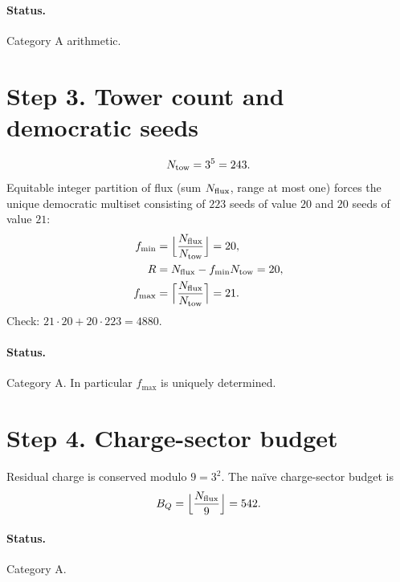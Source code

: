 \paragraph{Status.} Category A arithmetic.

\section{Step 3. Tower count and democratic seeds}

\begin{equation}
N_{\mathrm{tow}}
=
3^{5}
=
243.
\end{equation}
Equitable integer partition of flux (sum \(N_{\mathrm{flux}}\), range at most one) forces the unique democratic multiset consisting of \(223\) seeds of value \(20\) and \(20\) seeds of value \(21\):
\begin{align}
f_{\min}
&=
\Bigl\lfloor\frac{N_{\mathrm{flux}}}{N_{\mathrm{tow}}}\Bigr\rfloor
=
20,
\\
R
&=
N_{\mathrm{flux}} - f_{\min}N_{\mathrm{tow}}
=
20,
\\
f_{\max}
&=
\Bigl\lceil\frac{N_{\mathrm{flux}}}{N_{\mathrm{tow}}}\Bigr\rceil
=
21.
\end{align}
Check: \(21\cdot 20 + 20\cdot 223 = 4880\).

\paragraph{Status.} Category A. In particular \(f_{\max}\) is uniquely determined.

\section{Step 4. Charge-sector budget}

Residual charge is conserved modulo \(9=3^{2}\). The na\"ive charge-sector budget is
\begin{equation}
B_{Q}
=
\Bigl\lfloor\frac{N_{\mathrm{flux}}}{9}\Bigr\rfloor
=
542.
\end{equation}

\paragraph{Status.} Category A.

